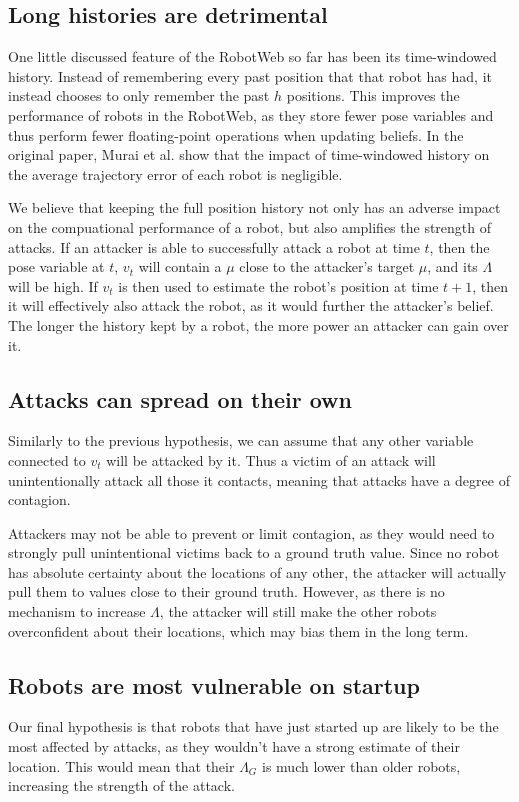 \subsection{Long histories are detrimental} \label{hyp:3} %
One little discussed feature of the RobotWeb so far has been its time-windowed history. Instead of remembering every past position that that robot has had, it instead chooses to only remember the past $h$ positions. This improves the performance of robots in the RobotWeb, as they store fewer pose variables and thus perform fewer floating-point operations when updating beliefs. In the original paper, Murai et al. show that the impact of time-windowed history on the average trajectory error of each robot is negligible.


We believe that keeping the full position history not only has an adverse impact on the compuational performance of a robot, but also amplifies the strength of attacks. If an attacker is able to successfully attack a robot at time $t$, then the pose variable at $t$, $v_t$ will contain a $\mu$ close to the attacker's target $\mu$, and its $\Lambda$ will be high. If $v_t$ is then used to estimate the robot's position at time $t+1$, then it will effectively also attack the robot, as it would further the attacker's belief. The longer the history kept by a robot, the more power an attacker can gain over it.

\subsection{Attacks can spread on their own} \label{hyp:4} %
Similarly to the previous hypothesis, we can assume that any other variable connected to $v_t$ will be attacked by it. Thus a victim of an attack will unintentionally attack all those it contacts, meaning that attacks have a degree of contagion. 

Attackers may not be able to prevent or limit contagion, as they would need to strongly pull unintentional victims back to a ground truth value. Since no robot has absolute certainty about the locations of any other, the attacker will actually pull them to values close to their ground truth. However, as there is no mechanism to increase $\Lambda$, the attacker will still make the other robots overconfident about their locations, which may bias them in the long term.
\subsection{Robots are most vulnerable on startup} \label{hyp:5}
Our final hypothesis is that robots that have just started up are likely to be the most affected by attacks, as they wouldn't have a strong estimate of their location. This would mean that their $\Lambda_G$ is much lower than older robots, increasing the strength of the attack.

